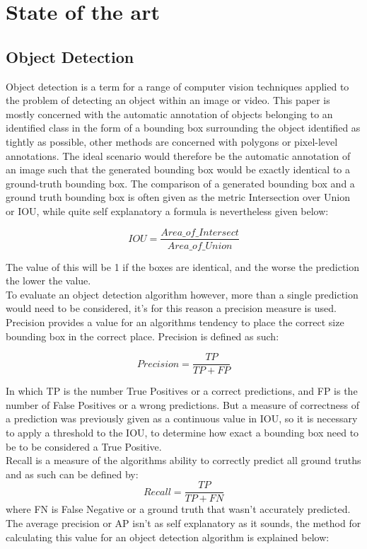 \documentclass[conference]{IEEEtran}
\begin{document}
\section{State of the art}

\subsection{Object Detection}
Object detection is a term for a range of computer vision techniques applied to the problem of detecting an object within an image or video. This paper is mostly concerned with the automatic annotation of objects belonging to an identified class in the form of a bounding box surrounding the object identified as tightly as possible, other methods are concerned with polygons or pixel-level annotations. The ideal scenario would therefore be the automatic annotation of an image such that the generated bounding box would be exactly identical to a ground-truth bounding box. The comparison of a generated bounding box and a ground truth bounding box is often given as the metric Intersection over Union or IOU, while quite self explanatory a formula is nevertheless given below:

\[ IOU = \frac{Area\_of\_Intersect}{Area\_of\_Union} \]

The value of this will be 1 if the boxes are identical, and the worse the prediction the lower the value.\\
To evaluate an object detection algorithm however, more than a single prediction would need to be considered, it's for this reason a precision measure is used. Precision provides a value for an algorithms tendency to place the correct size bounding box in the correct place. Precision is defined as such:

\[Precision = \frac{TP}{TP+FP}\]

In which TP is the number True Positives or a correct predictions, and FP is the number of False Positives or a wrong predictions. But a measure of correctness of a prediction was previously given as a continuous value in IOU, so it is necessary to apply a threshold to the IOU, to determine how exact a bounding box need to be to be considered a True Positive.
\\Recall is a measure of the algorithms ability to correctly predict all ground truths and as such can be defined by:
\[Recall = \frac{TP}{TP+FN}\]
where FN is False Negative or a ground truth that wasn't accurately predicted.\\
The average precision or AP isn't as self explanatory as it sounds, the method for calculating this value for an object detection algorithm is explained below:
\end{document}
